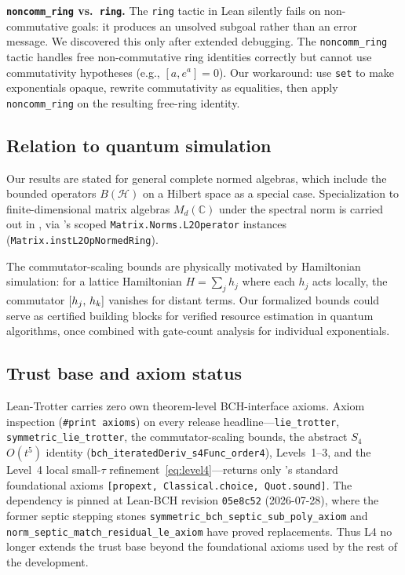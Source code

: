 \textbf{\texttt{noncomm\_ring} vs.\ \texttt{ring}.}
The \texttt{ring} tactic in Lean silently fails on non-commutative goals:
it produces an unsolved subgoal rather than an error message. We discovered
this only after extended debugging. The \texttt{noncomm\_ring} tactic handles
free non-commutative ring identities correctly but cannot use commutativity
hypotheses (e.g., $[a, e^a] = 0$). Our workaround: use \texttt{set} to make
exponentials opaque, rewrite commutativity as equalities, then apply
\texttt{noncomm\_ring} on the resulting free-ring identity.

\subsection{Relation to quantum simulation}
\label{sec:quantum}

Our results are stated for general complete normed algebras, which include
the bounded operators $B(\mathcal{H})$ on a Hilbert space as a special case.
Specialization to finite-dimensional matrix algebras
$M_d(\mathbb{C})$ under the spectral norm is carried out in
, via \Mathlib's scoped
\texttt{Matrix.Norms.L2Operator} instances
(\texttt{Matrix.instL2OpNormedRing}).

The commutator-scaling bounds are physically motivated by Hamiltonian
simulation: for a lattice Hamiltonian $H = \sum_j h_j$ where each $h_j$ acts
locally, the commutator $[h_j,\,h_k]$ vanishes for distant terms.
Our formalized bounds could serve as certified building blocks for verified
resource estimation in quantum algorithms, once combined with gate-count
analysis for individual exponentials.

\subsection{Trust base and axiom status}
\label{sec:axiom-status}

Lean-Trotter carries zero own theorem-level BCH-interface axioms.
Axiom inspection (\texttt{\#print axioms}) on every release
headline---\texttt{lie\_trotter}, \texttt{symmetric\_lie\_trotter}, the
commutator-scaling bounds, the abstract $S_4$ $O(t^5)$ identity
(\texttt{bch\_iteratedDeriv\_s4Func\_order4}), Levels~1--3, and the
Level~4 local small-$\tau$ refinement~\eqref{eq:level4}---returns only
\Lean's standard foundational axioms \texttt{[propext,
Classical.choice, Quot.sound]}. The dependency is pinned at Lean-BCH
revision \texttt{05e8c52} (2026-07-28), where the former septic
stepping stones \texttt{symmetric\_bch\_septic\_sub\_poly\_axiom} and
\texttt{norm\_septic\_match\_residual\_le\_axiom} have proved
replacements. Thus L4 no longer extends the trust base beyond the
foundational axioms used by the rest of the development.
